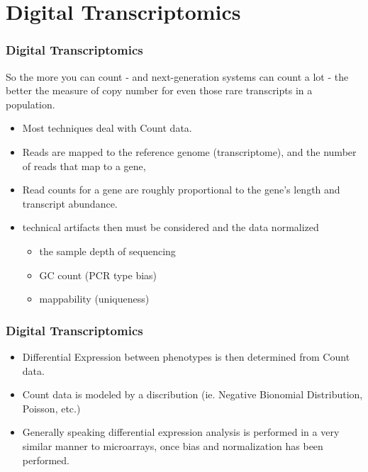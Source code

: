 \documentclass[pdf]{beamer}
\begin{document}
\section{Digital Transcriptomics}
\begin{frame}
  \frametitle{Digital Transcriptomics}
So the more you can count - and next-generation systems can count a lot - the better the measure of copy number for even those rare transcripts in a population.\\
\vspace{0.2in}
  \begin{itemize}
   \item Most techniques deal with Count data.
   \item  Reads are mapped to the reference genome (transcriptome), and the number of reads that map to a gene,
  \item Read counts for a gene are roughly proportional to the gene's length and transcript abundance.
  \item technical artifacts then must be considered and the data normalized
  \begin{itemize}
    \item the sample depth of sequencing
    \item GC count (PCR type bias)
    \item mappability (uniqueness)
  \end{itemize}  
  \end{itemize}
\end{frame}

\begin{frame}
  \frametitle{Digital Transcriptomics}
  \begin{itemize}
  \item Differential Expression between phenotypes is then determined from Count data.
  \item Count data is modeled by a discribution (ie. Negative Bionomial Distribution, Poisson, etc.)
  \item Generally speaking differential expression analysis is performed in a very similar manner to microarrays, once bias and normalization has been performed.
  \end{itemize}
\end{frame}
\end{document}

